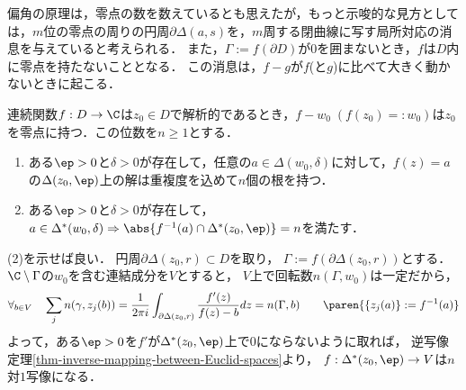 \documentclass[uplatex, dvipdfmx]{jsreport}
\begin{document}
\begin{tcolorbox}[colframe=ForestGreen, colback=ForestGreen!10!white,breakable,colbacktitle=ForestGreen!40!white,coltitle=black,fonttitle=\bfseries\sffamily,
title=]
    偏角の原理は，零点の数を数えているとも思えたが，もっと示唆的な見方としては，$m$位の零点の周りの円周$\partial\Delta(a,s)$を，$m$周する閉曲線に写す局所対応の消息を与えていると考えられる．
    また，$\Gamma:=f(\partial D)$が$0$を囲まないとき，$f$は$D$内に零点を持たないこととなる．
    この消息は，$f-g$が$f$(と$g$)に比べて大きく動かないときに起こる．
\end{tcolorbox}

\begin{corollary}[零点の近傍での対応]
    連続関数$f:D\to\C$は$z_0\in D$で解析的であるとき，$f-w_0\;(f(z_0)=:w_0)$は$z_0$を零点に持つ．この位数を$n\ge1$とする．
    \begin{enumerate}
        \item ある$\ep>0$と$\delta>0$が存在して，任意の$a\in\Delta(w_0,\delta)$に対して，$f(z)=a$の$\Delta(z_0,\ep)$上の解は重複度を込めて$n$個の根を持つ．
        \item ある$\ep>0$と$\delta>0$が存在して，$a\in\Delta^*(w_0,\delta)\Rightarrow\abs{f^{-1}(a)\cap\Delta^*(z_0,\ep)}=n$を満たす．
    \end{enumerate}
\end{corollary}
\begin{Proof}
    (2)を示せば良い．
    円周$\partial\Delta(z_0,r)\subset D$を取り，
    $\Gamma:=f(\partial\Delta(z_0,r))$とする．
    $\C\setminus\Gamma$の$w_0$を含む連結成分を$V$とすると，
    $V$上で回転数$n(\Gamma,w_0)$は一定だから，
    \[\forall_{b\in V}\quad\sum_{j}n(\gamma,z_j(b))=\frac{1}{2\pi i}\int_{\partial\Delta(z_0,r)}\frac{f'(z)}{f(z)-b}dz=n(\Gamma,b)\qquad\paren{\{z_j(a)\}:=f^{-1}(a)}\]
    よって，ある$\ep>0$を$f'$が$\Delta^*(z_0,\ep)$上で$0$にならないように取れば，
    逆写像定理\ref{thm-inverse-mapping-between-Euclid-spaces}より，
    $f:\Delta^*(z_0,\ep)\to V$は$n$対$1$写像になる．
\end{Proof}
\end{document}
